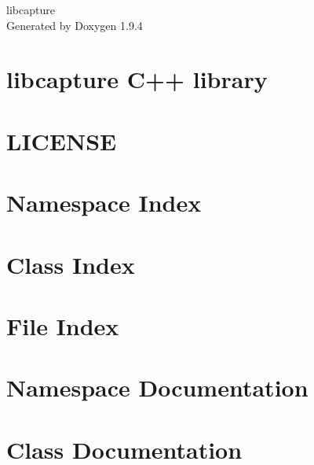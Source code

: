 \documentclass[twoside]{book}
\newcommand{\+}{\discretionary{\mbox{\scriptsize$\hookleftarrow$}}{}{}}
\newcommand{\clearemptydoublepage}{%
    \newpage{\pagestyle{empty}\cleardoublepage}%
  }
\begin{document}
  \raggedbottom
    \hypersetup{pageanchor=false,
                bookmarksnumbered=true,
                pdfencoding=unicode
               }
  \begin{titlepage}
  \vspace*{7cm}
  \begin{center}%
  {\Large libcapture}\\
  \vspace*{1cm}
  {\large Generated by Doxygen 1.9.4}\\
  \end{center}
  \end{titlepage}
  \clearemptydoublepage
  \tableofcontents
  \clearemptydoublepage
  \hypersetup{pageanchor=true}
\chapter{libcapture C++ library}
\label{index}\hypertarget{index}{}
\chapter{LICENSE}
\label{md_LICENSE}

\chapter{Namespace Index}

\chapter{Class Index}

\chapter{File Index}

\chapter{Namespace Documentation}

\chapter{Class Documentation}















\end{document}
